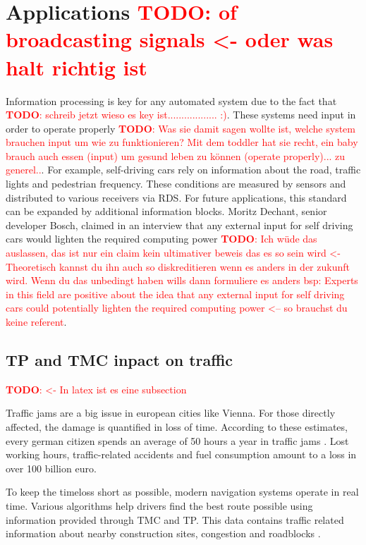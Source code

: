 \documentclass[conference,11pt,a4paper]{IEEEtran}
\newcommand{\todo}[1]{\textcolor{red}{\textbf{TODO}: #1}}
\begin{document}
		
	\section{Applications \todo{of broadcasting signals <- oder was halt richtig ist}}
		Information processing is key for any automated system due to the fact that \todo{schreib jetzt wieso es key ist.................. :)}. These systems need input in order to operate properly \todo{Was sie damit sagen wollte ist, welche system brauchen input um wie zu funktionieren? Mit dem toddler hat sie recht, ein baby brauch auch essen (input) um gesund leben zu können (operate properly)... zu generel..}. For example, self-driving cars rely on information about the road, traffic lights and pedestrian frequency. These conditions are measured by sensors and distributed to various receivers via RDS. For future applications, this standard can be expanded by additional information blocks. Moritz Dechant, senior developer Bosch, claimed in an interview that any external input for self driving cars would lighten the required computing  power \cite{bosch} \todo{Ich wüde das auslassen, das ist nur ein claim kein ultimativer beweis das es so sein wird <- Theoretisch kannst du ihn auch so diskreditieren wenn es anders in der zukunft wird. Wenn du das unbedingt haben wills dann formuliere es anders bsp: Experts in this field are positive about the idea that any external input for self driving cars could potentially lighten the required computing  power <-- so brauchst du keine referent}.
			
		\subsection{TP and TMC inpact on traffic} \todo{ <- In latex ist es eine subsection}
		
		Traffic jams are a big issue in european cities like Vienna. For those directly affected, the damage is quantified in loss of time. According to these estimates, every german citizen spends an average of 50 hours a year in traffic jams \cite{Stau}. Lost working hours, traffic-related accidents and fuel consumption amount to a loss in over 100 billion euro. 
		
		To keep the timeloss short as possible, modern navigation systems operate in real time. 
		Various algorithms help drivers find the best route possible using information provided through TMC and TP. This data contains traffic related information about nearby construction sites, congestion and roadblocks \cite{uyeki2010route}.
		
\end{document}
